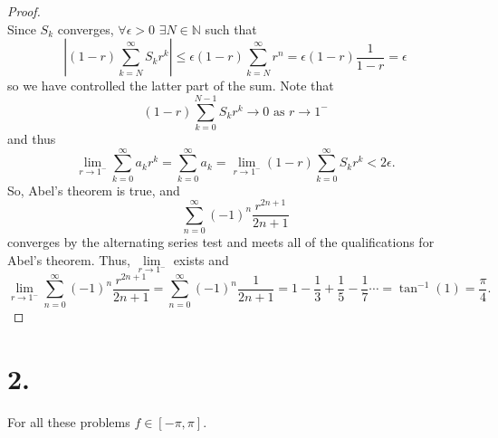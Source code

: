 \documentclass{article}
\begin{document}
\begin{proof}
\[\]
Since $S_k$ converges, $\forall \epsilon > 0$ $\exists N \in \mathbb{N}$ such that 
\[
 \left|(1 - r) \sum\limits_{k = N}^{\infty} S_kr^k \right| \leq \epsilon (1 - r) \sum\limits_{k = N}^{\infty}r^n = \epsilon (1 - r) \frac{1}{1 - r} = \epsilon 
\]
so we have controlled the latter part of the sum. 
Note that 
\[
 (1 - r)\sum\limits_{k = 0}^{N - 1}S_kr^k \to 0 \text{ as } r \to 1^- 
\]
and thus 
\[
 \lim\limits_{r \to 1^-}\sum\limits_{k = 0}^{\infty}a_kr^k = \sum\limits_{k = 0}^{\infty}a_k = \lim\limits_{r \to 1^-}(1 - r)\sum\limits_{k = 0}^{\infty}S_kr^k < 2 \epsilon.  
\]
So, Abel's theorem is true, and 
\[
 \sum\limits_{n =0 }^{\infty} (-1)^n \frac{r^{2n + 1}}{2n + 1}  
\]
converges by the alternating series test and meets all of the qualifications for Abel's theorem. Thus, $\lim\limits_{r \to 1^-}$ exists and 
\[
 \lim\limits_{r \to 1^-} \sum\limits_{n = 0}^{\infty}(-1)^n\frac{r^{2n + 1}}{2n+1} = \sum\limits_{n = 0}^{\infty}(-1)^n\frac{1}{2n + 1} = 1 - \frac{1}{3} + \frac{1}{5} - \frac{1}{7} \cdots = \tan^{-1}(1) = \frac{\pi}{4}.  
\]
\end{proof}

\section*{2.}
For all these problems $f \in [-\pi, \pi]$. 
\end{document}
